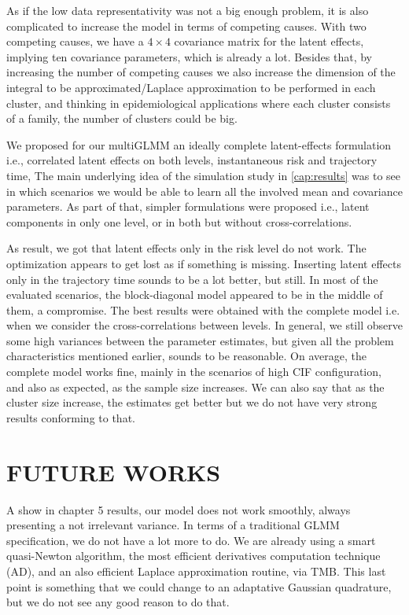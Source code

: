 As if the low data representativity was not a big enough problem, it is
also complicated to increase the model in terms of competing
causes. With two competing causes, we have a \(4\times4\) covariance
matrix for the latent effects, implying ten covariance parameters, which
is already a lot. Besides that, by increasing the number of competing
causes we also increase the dimension of the integral to be
approximated/Laplace approximation to be performed in each cluster, and
thinking in epidemiological applications where each cluster consists of
a family, the number of clusters could be big.

We proposed for our multiGLMM an ideally complete latent-effects
formulation i.e., correlated latent effects on both levels,
instantaneous risk and trajectory time, The main underlying idea of the
simulation study in \autoref{cap:results} was to see in which scenarios
we would be able to learn all the involved mean and covariance
parameters. As part of that, simpler formulations were proposed i.e.,
latent components in only one level, or in both but without
cross-correlations.

As result, we got that latent effects only in the risk level do not
work.  The optimization appears to get lost as if something is missing.
Inserting latent effects only in the trajectory time sounds to be a lot
better, but still. In most of the evaluated scenarios, the
block-diagonal model appeared to be in the middle of them, a
compromise. The best results were obtained with the complete model
i.e. when we consider the cross-correlations between levels. In general,
we still observe some high variances between the parameter estimates,
but given all the problem characteristics mentioned earlier, sounds to
be reasonable. On average, the complete model works fine, mainly in the
scenarios of high CIF configuration, and also as expected, as the sample
size increases. We can also say that as the cluster size increase, the
estimates get better but we do not have very strong results conforming
to that.

\section{FUTURE WORKS}
\label{cap:future}

A show in chapter 5 results, our model does not work smoothly, always
presenting a not irrelevant variance. In terms of a traditional GLMM
specification, we do not have a lot more to do.  We are already using a
smart quasi-Newton algorithm, the most efficient derivatives computation
technique (AD), and an also efficient Laplace approximation routine, via
TMB. This last point is something that we could change to an adaptative
Gaussian quadrature, but we do not see any good reason to do that.

\cite{mcglm}
\cite{rmcglm}

